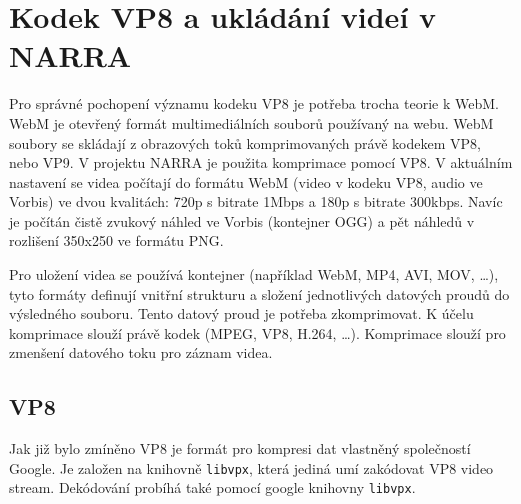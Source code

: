 \section {Kodek VP8 a ukládání videí v NARRA}
\par Pro správné pochopení významu kodeku VP8\cite{vp8} je potřeba trocha teorie k WebM\cite{webm}. WebM je otevřený formát multimediálních souborů používaný na webu. WebM soubory se skládají z obrazových toků komprimovaných právě kodekem VP8, nebo VP9. V projektu NARRA je použita komprimace pomocí VP8. V aktuálním nastavení se videa počítají do formátu WebM (video v kodeku VP8, audio ve Vorbis) ve dvou kvalitách: 720p s bitrate 1Mbps a 180p s bitrate 300kbps. Navíc je počítán čistě zvukový náhled ve Vorbis (kontejner OGG) a pět náhledů v rozlišení 350x250 ve formátu PNG. 
\par Pro uložení videa se používá kontejner (například WebM, MP4, AVI, MOV, \ldots), tyto formáty definují vnitřní strukturu a složení jednotlivých datových proudů do výsledného souboru. Tento datový proud je potřeba zkomprimovat. K účelu komprimace slouží právě kodek (MPEG, VP8, H.264, \ldots). Komprimace slouží pro zmenšení datového toku pro záznam videa.
\subsection{VP8}
\par Jak již bylo zmíněno VP8 je formát pro kompresi dat vlastněný společností Google. Je založen na knihovně \texttt{libvpx}, která jediná umí zakódovat VP8 video stream. Dekódování probíhá také pomocí google knihovny \texttt{libvpx}.